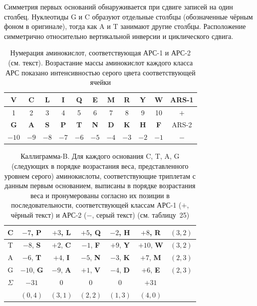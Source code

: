 \documentclass[12pt]{article}
\begin{document}
Симметрия первых оснований обнаруживается при сдвиге записей на один столбец. Нуклеотиды G и C образуют отдельные столбцы (обозначенные чёрным фоном в оригинале), тогда как A и T занимают другие столбцы. Расположение симметрично относительно вертикальной инверсии и циклического сдвига.

\begin{table}[htbp]
\centering
\caption{Нумерация аминокислот, соответствующая АРС-1 и АРС-2 (см. текст). Возрастание массы аминокислот каждого класса АРС показано интенсивностью серого цвета соответствующей ячейки}
\label{tab:ARS_numbering}
\begin{tabular}{|c|c|c|c|c|c|c|c|c|c|c|}
\hline
\textbf{V} & \textbf{C} & \textbf{L} & \textbf{I} & \textbf{Q} & \textbf{E} & \textbf{M} & \textbf{R} & \textbf{Y} & \textbf{W} & ARS-1 \\
\hline
1 & 2 & 3 & 4 & 5 & 6 & 7 & 8 & 9 & 10 & $+$ \\
\hline
\textbf{G} & \textbf{A} & \textbf{S} & \textbf{P} & \textbf{T} & \textbf{N} & \textbf{D} & \textbf{K} & \textbf{H} & \textbf{F} & ARS-2 \\
\hline
$-10$ & $-9$ & $-8$ & $-7$ & $-6$ & $-5$ & $-4$ & $-3$ & $-2$ & $-1$ & $-$ \\
\hline
\end{tabular}
\end{table}

\begin{table}[htbp]
\centering
\caption{Каллиграмма-B. Для каждого основания C, T, A, G (следующих в порядке возрастания веса, представленного уровнем серого) аминокислоты, соответствующие триплетам с данным первым основанием, выписаны в порядке возрастания веса и пронумерованы согласно их позиции в последовательности, соответствующей классам АРС-1 ($+$, чёрный текст) и АРС-2 ($-$, серый текст) (см. таблицу~25)}
\label{tab:calligram_B}
\begin{tabular}{|c|c|c|c|c|c|c|}
\hline
C & $-7$, \textbf{P} & $+3$, \textbf{L} & $+5$, \textbf{Q} & $-2$, \textbf{H} & $+8$, \textbf{R} & $(3, 2)$ \\
\hline
T & $-8$, \textbf{S} & $+2$, \textbf{C} & $-1$, \textbf{F} & $+9$, \textbf{Y} & $+10$, \textbf{W} & $(3, 2)$ \\
\hline
A & $-6$, \textbf{T} & $+4$, \textbf{I} & $-5$, \textbf{N} & $-3$, \textbf{K} & $+7$, \textbf{M} & $(2, 3)$ \\
\hline
G & $-10$, \textbf{G} & $-9$, \textbf{A} & $+1$, \textbf{V} & $-4$, \textbf{D} & $+6$, \textbf{E} & $(2, 3)$ \\
\hline
$\Sigma$ & $-31$ & 0 & 0 & 0 & $+31$ & \\
\hline
 & $(0, 4)$ & $(3, 1)$ & $(2, 2)$ & $(1, 3)$ & $(4, 0)$ & \\
\hline
\end{tabular}
\end{table}
\end{document}

